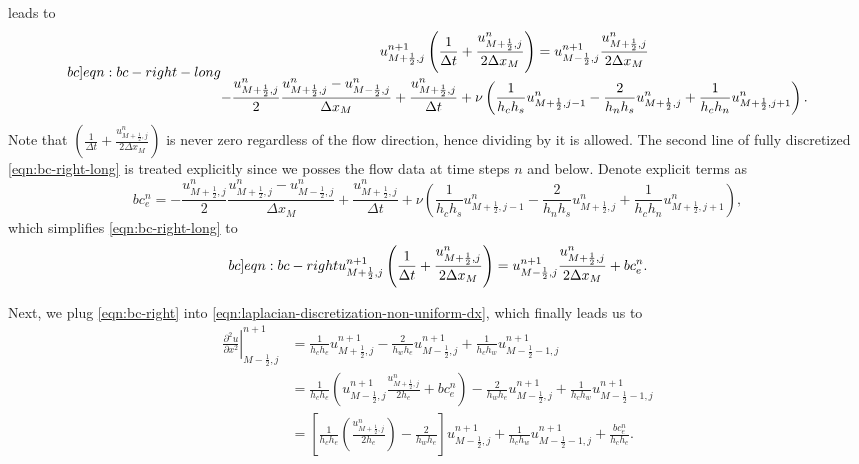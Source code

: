 \documentclass{article}
\begin{document}
leads to %
\begin{equation}\label[bc]{eqn:bc-right-long}
\begin{gathered}
{{u}^{n+1}_{M+\frac{1}{2},j}}\left(\frac{1}{\Delta t} + \frac{u^n_{M+\frac{1}{2},j}}{2\Delta x_M}\right)
=
u^{n+1}_{M-\frac{1}{2},j}\frac{u^n_{M+\frac{1}{2},j}}{2\Delta x_M}\\
-\frac{u^n_{M+\frac{1}{2},j}}{2}\frac{u^{n}_{M+\frac{1}{2},j}-u^{n}_{M-\frac{1}{2},j}}{\Delta x_M}
+\frac{{u}^n_{M+\frac{1}{2},j}}{\Delta t}
+\nu\left(\frac{1}{h_c h_s}u^{n}_{M+\frac{1}{2},j-1} - \frac{2}{h_n h_s}u^{n}_{M+\frac{1}{2},j} + \frac{1}{h_c h_n}u^n_{M+\frac{1}{2},j+1}\right).
\end{gathered}
\end{equation}
Note that $\left(\frac{1}{\Delta t} + \frac{u^n_{M+\frac{1}{2},j}}{2\Delta x_M}\right)$ is never zero regardless of the flow direction, hence dividing by it is allowed. The second line of fully discretized \cref{eqn:bc-right-long} is treated explicitly since we posses the flow data at time steps $n$ and below. Denote explicit terms as
\begin{equation*}
	bc_e^n=-\frac{u^n_{M+\frac{1}{2},j}}{2}\frac{u^{n}_{M+\frac{1}{2},j}-u^{n}_{M-\frac{1}{2},j}}{\Delta x_M}
+\frac{{u}^n_{M+\frac{1}{2},j}}{\Delta t}
+\nu\left(\frac{1}{h_c h_s}u^{n}_{M+\frac{1}{2},j-1} - \frac{2}{h_n h_s}u^{n}_{M+\frac{1}{2},j} + \frac{1}{h_c h_n}u^n_{M+\frac{1}{2},j+1}\right),
\end{equation*}
which simplifies \cref{eqn:bc-right-long} to 
\begin{equation}\label[bc]{eqn:bc-right}
\begin{gathered}
{{u}^{n+1}_{M+\frac{1}{2},j}}\left(\frac{1}{\Delta t} + \frac{u^n_{M+\frac{1}{2},j}}{2\Delta x_M}\right)
=
u^{n+1}_{M-\frac{1}{2},j}\frac{u^n_{M+\frac{1}{2},j}}{2\Delta x_M}+bc_e^n.
\end{gathered}
\end{equation}

Next, we plug \cref{eqn:bc-right} into \cref{eqn:laplacian-discretization-non-uniform-dx}, which finally leads us to
\begin{equation}
\begin{aligned}
	\left.\frac{\partial ^2 u}{\partial x^2}\right|_{M-\frac{1}{2},j}^{n+1}
	&=\frac{1}{h_c h_e}u^{n+1}_{M+\frac{1}{2},j} - \frac{2}{h_w h_e}u^{n+1}_{M-\frac{1}{2},j} + \frac{1}{h_c h_w}u^{n+1}_{M-\frac{1}{2}-1,j}\\
	&=\frac{1}{h_c h_e}\left(u^{n+1}_{M-\frac{1}{2},j}\frac{u^n_{M+\frac{1}{2},j}}{2h_e}+bc^n_e\right)- \frac{2}{h_w h_e}u^{n+1}_{M-\frac{1}{2},j} + \frac{1}{h_c h_w}u^{n+1}_{M-\frac{1}{2}-1,j}\\
	&=\left[ \frac{1}{h_c h_e}\left(\frac{u^n_{M+\frac{1}{2},j}}{2h_e} \right) -\frac{2}{h_w h_e}\right]u^{n+1}_{M-\frac{1}{2},j} + \frac{1}{h_c h_w}u^{n+1}_{M-\frac{1}{2}-1,j} + \frac{bc^n_e}{h_c h_e}.
\end{aligned}
\end{equation}
\end{document}
